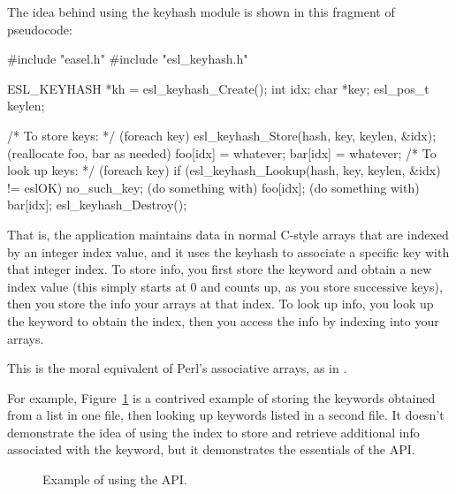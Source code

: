 The idea behind using the keyhash module is shown in this fragment of
pseudocode:

\begin{cchunk}
       #include "easel.h"
       #include "esl_keyhash.h"
     
       ESL_KEYHASH *kh = esl_keyhash_Create();
       int          idx;
       char        *key;
       esl_pos_t    keylen;
       
       /* To store keys: */
       (foreach key) {
          esl_keyhash_Store(hash, key, keylen, &idx);       
          (reallocate foo, bar as needed)
          foo[idx] = whatever;
          bar[idx] = whatever;
       }     
       /* To look up keys: */
       (foreach key) {
          if (esl_keyhash_Lookup(hash, key, keylen, &idx) != eslOK) { no_such_key; }
          (do something with) foo[idx];
          (do something with) bar[idx];
       }   
       esl_keyhash_Destroy();
\end{cchunk}

That is, the application maintains data in normal C-style arrays that
are indexed by an integer index value, and it uses the keyhash to
associate a specific key with that integer index. To store info, you
first store the keyword and obtain a new index value (this simply
starts at 0 and counts up, as you store successive keys), then you
store the info your arrays at that index. To look up info, you look up
the keyword to obtain the index, then you access the info by indexing
into your arrays.

This is the moral equivalent of Perl's associative arrays, as in
.

For example, Figure~\ref{fig:keyhash_example} is a contrived example
of storing the keywords obtained from a list in one file, then looking
up keywords listed in a second file. It doesn't demonstrate the idea
of using the index to store and retrieve additional info associated
with the keyword, but it demonstrates the essentials of the
 API.

\begin{figure}

\caption{Example of using the  API.}
\label{fig:keyhash_example}
\end{figure}


